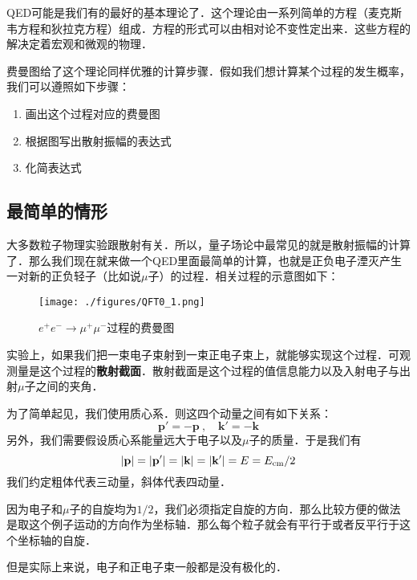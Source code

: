 

QED可能是我们有的最好的基本理论了．这个理论由一系列简单的方程（麦克斯韦方程和狄拉克方程）组成．方程的形式可以由相对论不变性定出来．这些方程的解决定着宏观和微观的物理．

费曼图给了这个理论同样优雅的计算步骤．假如我们想计算某个过程的发生概率，我们可以遵照如下步骤：

\begin{enumerate}
\item 画出这个过程对应的费曼图
\item 根据图写出散射振幅的表达式
\item 化简表达式
\end{enumerate}

\subsection{最简单的情形}
大多数粒子物理实验跟散射有关．所以，量子场论中最常见的就是散射振幅的计算了．那么我们现在就来做一个QED里面最简单的计算，也就是正负电子湮灭产生一对新的正负轻子（比如说$\mu$子）的过程．相关过程的示意图如下：

\begin{figure}[ht]
\centering
\texttt{[image: ./figures/QFT0\_1.png]}
\caption{$e^+e^-\rightarrow\mu^+\mu^-$过程的费曼图} \label{QFT0_fig1}
\end{figure}

实验上，如果我们把一束电子束射到一束正电子束上，就能够实现这个过程．可观测量是这个过程的\textbf{散射截面}．散射截面是这个过程的值信息能力以及入射电子与出射$\mu$子之间的夹角．

为了简单起见，我们使用质心系．则这四个动量之间有如下关系：
\begin{equation}
\mathbf p' = - \mathbf p~, \quad \mathbf k'=-\mathbf k
\end{equation}
另外，我们需要假设质心系能量远大于电子以及$\mu$子的质量．于是我们有
\begin{equation}
|\mathbf p| = |\mathbf p'| = |\mathbf k| = |\mathbf k'| = E = E_{\rm cm}/2
\end{equation}
我们约定粗体代表三动量，斜体代表四动量．

因为电子和$\mu$子的自旋均为$1/2$，我们必须指定自旋的方向．那么比较方便的做法是取这个例子运动的方向作为坐标轴．那么每个粒子就会有平行于或者反平行于这个坐标轴的自旋．

但是实际上来说，电子和正电子束一般都是没有极化的．
















